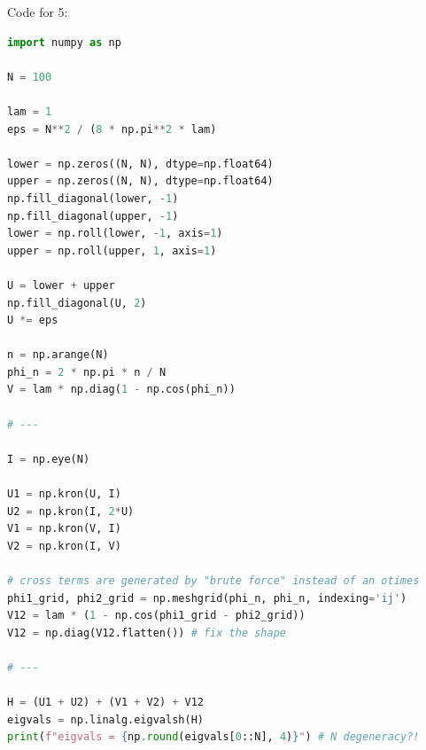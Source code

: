 \newpage
\begin{callout}{Code for 5:}

        \begin{lstlisting}[language=Python]
import numpy as np

N = 100

lam = 1
eps = N**2 / (8 * np.pi**2 * lam)

lower = np.zeros((N, N), dtype=np.float64)
upper = np.zeros((N, N), dtype=np.float64)
np.fill_diagonal(lower, -1)
np.fill_diagonal(upper, -1)
lower = np.roll(lower, -1, axis=1)
upper = np.roll(upper, 1, axis=1)

U = lower + upper
np.fill_diagonal(U, 2)
U *= eps

n = np.arange(N)
phi_n = 2 * np.pi * n / N
V = lam * np.diag(1 - np.cos(phi_n))

# --- 

I = np.eye(N)

U1 = np.kron(U, I)
U2 = np.kron(I, 2*U)
V1 = np.kron(V, I)
V2 = np.kron(I, V)

# cross terms are generated by "brute force" instead of an otimes  
phi1_grid, phi2_grid = np.meshgrid(phi_n, phi_n, indexing='ij')
V12 = lam * (1 - np.cos(phi1_grid - phi2_grid))
V12 = np.diag(V12.flatten()) # fix the shape

# ---

H = (U1 + U2) + (V1 + V2) + V12
eigvals = np.linalg.eigvalsh(H)
print(f"eigvals = {np.round(eigvals[0::N], 4)}") # N degeneracy?!
        \end{lstlisting}

    \end{callout}

